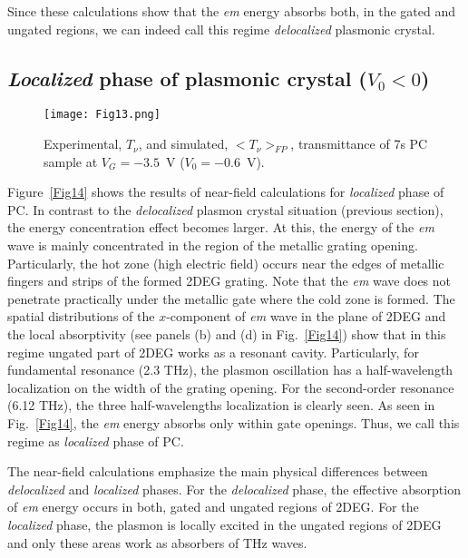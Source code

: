 \documentclass[%
 reprint,
 amsmath,amssymb,
 aps,
]{revtex4-2}
\begin{document}
Since these calculations show that the \textit{em} energy absorbs both, in the gated and ungated regions, we can indeed call this regime \textit{delocalized} plasmonic crystal.

\subsection{ \textit{Localized} phase of plasmonic crystal ($V_0 < 0$)}

\begin{figure}[b!!!]
\texttt{[image: Fig13.png]}
\caption{\label{Fig13} Experimental, $T_{\nu}$, and simulated, $<T_{\nu}>_{FP}$, transmittance of 7s PC sample at $V_G = -3.5$~V ($V_0 = -0.6$~V).}
\end{figure}


Figure~\ref{Fig14} shows the results of near-field calculations for \textit{localized} phase of PC. In contrast to the \textit{delocalized} plasmon crystal situation (previous section), the energy concentration effect becomes larger. At this, the energy of the \textit{em} wave is mainly concentrated in the region of the metallic grating opening. 
Particularly, the hot zone (high electric field) occurs near the edges of metallic fingers and strips of the formed 2DEG grating. Note that the \textit{em} wave does not penetrate practically under the metallic gate where the cold zone is formed.  
The spatial distributions of the $x$-component of \textit{em} wave in the plane of 2DEG and the local absorptivity (see panels (b) and (d) in Fig.~\ref{Fig14}) show that in this regime ungated part of 2DEG works as a resonant cavity. Particularly, for fundamental resonance (2.3 THz), the plasmon oscillation has a half-wavelength localization on the width of the grating opening.  For the second-order resonance (6.12 THz), the three half-wavelengths localization is clearly seen. As seen in Fig.~\ref{Fig14}, the \textit{ em} energy absorbs only within gate openings. Thus, we call this regime as \textit{ localized} phase of PC.


The near-field calculations emphasize the main physical differences between \textit{ delocalized} and \textit{ localized} phases. For the \textit{ delocalized} phase, the effective absorption of \textit{ em} energy occurs in both, gated and ungated regions of 2DEG. For the \textit{ localized} phase, the plasmon is locally excited in the ungated regions of 2DEG and only these areas work as absorbers of THz waves.
\end{document}
